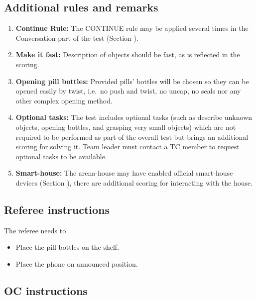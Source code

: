 \subsection{Additional rules and remarks}
\begin{enumerate}
	\item \textbf{Continue Rule:} The CONTINUE rule may be applied several times in the Conversation part of the test (Section ).

	\item \textbf{Make it fast:} Description of objects should be fast, as is reflected in the scoring.
	
	\item \textbf{Opening pill bottles:} Provided pills' bottles will be chosen so they can be opened easily by twist, i.e.~no push and twist, no uncap, no seals nor any other complex opening method.

	\item \textbf{Optional tasks:} The test includes optional tasks (such as describe unknown objects, opening bottles, and grasping very small objects) which are not required to be performed as part of the overall test but brings an additional scoring for solving it. Team leader must contact a TC member to request optional tasks to be available.

	\item \textbf{Smart-house:} The arena-house may have enabled official smart-house devices (Section ), there are additional scoring for interacting with the house.
\end{enumerate}

\subsection{Referee instructions}

The referee needs to
\begin{itemize}
	\item Place the pill bottles on the shelf.
	\item Place the phone on announced position.
\end{itemize}

\subsection{OC instructions}

